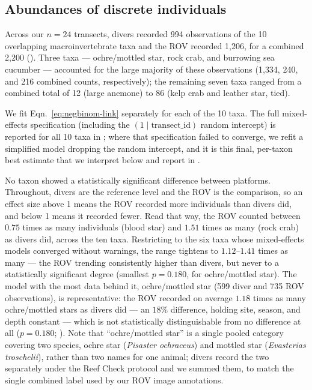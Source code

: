\documentclass[11pt]{article}
\begin{document}
\subsection{Abundances of discrete individuals}
\label{subsec:abundance_results}

Across our $n=24$ transects, divers recorded 994 observations of the 10
overlapping macroinvertebrate taxa and the ROV recorded 1{,}206, for a
combined 2{,}200 ().
Three taxa --- ochre/mottled star, rock crab, and burrowing sea cucumber ---
accounted for the large majority of these observations (1{,}334, 240, and 216
combined counts, respectively); the remaining seven taxa ranged from a
combined total of 12 (large anemone) to 86 (kelp crab and leather star, tied).

We fit Eqn.~\ref{eq:negbinom-link} separately for each of the 10 taxa.
The full mixed-effects specification (including the
$(1\mid\mathrm{transect\_id})$ random intercept) is reported for all 10 taxa in
; where that specification
failed to converge, we refit a simplified model dropping the random
intercept, and it is this final, per-taxon best estimate that we interpret
below and report in .

No taxon showed a statistically significant difference between platforms.
Throughout, divers are the reference level and the ROV is the comparison, so
an effect size above 1 means the ROV recorded more individuals than divers
did, and below 1 means it recorded fewer.
Read that way, the ROV counted between $0.75$ times as many individuals (blood
star) and $1.51$ times as many (rock crab) as divers did, across the ten taxa.
Restricting to the six taxa whose mixed-effects models converged without
warnings, the range tightens to $1.12$--$1.41$ times as many --- the ROV
trending consistently higher than divers, but never to a statistically
significant degree (smallest $p=0.180$, for ochre/mottled star).
The model with the most data behind it, ochre/mottled star (599 diver and 735
ROV observations), is representative: the ROV recorded on average $1.18$ times
as many ochre/mottled stars as divers did --- an $18\%$ difference, holding
site, season, and depth constant --- which is not statistically
distinguishable from no difference at all ($p=0.180$;
).
Note that ``ochre/mottled star'' is a single pooled category covering two
species, ochre star (\textit{Pisaster ochraceus}) and mottled star
(\textit{Evasterias troschelii}), rather than two names for one animal; divers
record the two separately under the Reef Check protocol and we summed them, to
match the single combined label used by our ROV image annotations.
\end{document}
